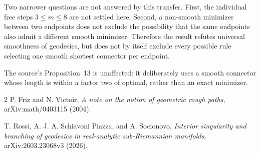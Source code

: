 \documentclass[11pt]{article}
\begin{document}
Two narrower questions are not answered by this transfer.  First, the
individual free steps $3\leq m\leq8$ are not settled here.  Second, a
non-smooth minimizer between two endpoints does not exclude the possibility
that the same endpoints also admit a different smooth minimizer.  Therefore
the result refutes universal smoothness of geodesics, but does not by itself
exclude every possible rule selecting one smooth shortest connector per
endpoint.

The source's Proposition~13 is unaffected: it deliberately uses a smooth
connector whose length is within a factor two of optimal, rather than an
exact minimizer.

\begin{thebibliography}{2}
P. Friz and N. Victoir,
\emph{A note on the notion of geometric rough paths},
arXiv:math/0403115 (2004).

T. Rossi, A. J. A. Schiavoni Piazza, and A. Socionovo,
\emph{Interior singularity and branching of geodesics in real-analytic
sub-Riemannian manifolds}, arXiv:2603.23068v3 (2026).
\end{thebibliography}
\end{document}
